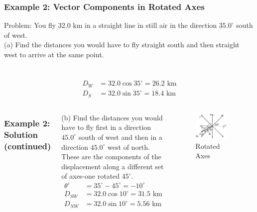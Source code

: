 \documentclass{beamer}
\begin{document}
\begin{frame}
\frametitle{Example 2: Vector Components in Rotated Axes}
Problem: You fly 32.0 km in a straight line in still air in the direction $35.0^{\circ}$ south of west. \\
(a) Find the distances you would have to fly straight south and then straight west to arrive at the same point.
\\
\\

\\


\begin{align*}
D_W &= 32.0 \cos 35^\circ = 26.2 \text{ km} \\
D_S &= 32.0 \sin 35^\circ = 18.4 \text{ km}
\end{align*}

\end{frame}

\begin{frame}
\begin{columns}
\frametitle{Example 2: Solution (continued)}
(b) Find the distances you would have to fly first in a direction $45.0^{\circ}$ south of west and then in a direction $45.0^{\circ}$ west of north. These are the components of the displacement along a different set of axes-one rotated $45^{\circ}$.
\begin{align*}
\theta' &= 35^\circ - 45^\circ = -10^\circ \\
D_{SW} &= 32.0 \cos 10^\circ = 31.5 \text{ km} \\
D_{NW} &= 32.0 \sin 10^\circ = 5.56 \text{ km}
\end{align*}

\begin{figure}
\centering
\includegraphics[width=0.8\textwidth]{phys12-vectors-vector-addition-figure-21.png}
\caption{Rotated Axes}
\end{figure}
\end{columns}

\end{frame}
\end{document}
